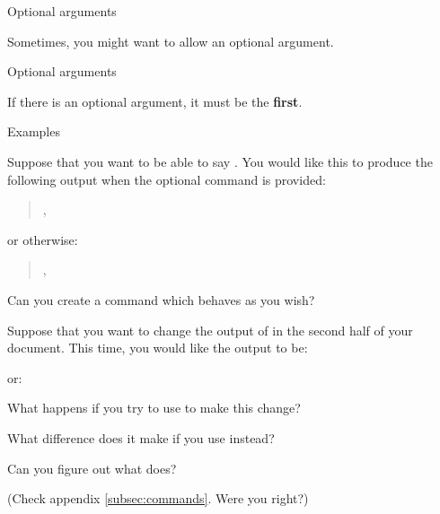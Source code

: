 \begin{frame}{Optional arguments}

  Sometimes, you might want to allow an optional argument.

  \begin{block}{Optional arguments}
    \alert<1>{}\newline
    \alert<1>{}
  \end{block}

  If there is an optional argument, it must be the \textbf{first}.

  \begin{block}{Examples}
	\newline
  \end{block}

\end{frame}

\begin{exercise}
  Suppose that you want to be able to say .
  You would like this to produce the following output when the optional command is provided:
  \begin{quotation}
	\textbf{},  
  \end{quotation}
  or otherwise:
  \begin{quotation}
	\textbf{}, 
  \end{quotation}
  Can you create a command which behaves as you wish?

  Suppose that you want to change the output of  in the second half of your document.
  This time, you would like the output to be:
  \begin{quotation}
	\textbf{}  
  \end{quotation}
  or:
  \begin{quotation}
	\textbf{ }
  \end{quotation}

  What happens if you try to use  to make this change?

  What difference does it make if you use  instead?

  Can you figure out what  does?

  (Check appendix \ref{subsec:commands}.
  Were you right?)
\end{exercise}

